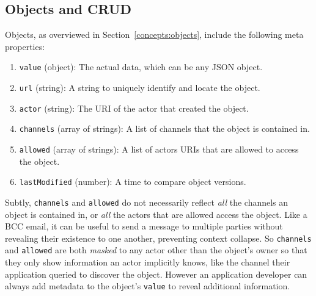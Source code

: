 
\subsection{Objects and CRUD}

Objects, as overviewed in Section~\ref{concepts:objects}, include
the following meta properties:
\begin{enumerate}
\item
\texttt{value} (object): The actual data, which can be any JSON object.
\item
\texttt{url} (string): A string to uniquely identify and locate the object.
\item
\texttt{actor} (string): The URI of the actor that created the object.
\item
\texttt{channels} (array of strings): A list of channels that the object is contained in.
\item
\texttt{allowed} (array of strings): A list of actors URIs that are allowed to access the object.
\item
\texttt{lastModified} (number): A time to compare object versions.
\end{enumerate}

Subtly, \texttt{channels} and \texttt{allowed} do not necessarily
reflect \emph{all} the channels an object is contained in, or
\emph{all} the actors that are allowed access the object.
Like a BCC email, it can be useful to send a message to multiple parties
without revealing their existence to one another, preventing
context collapse.
So \texttt{channels} and \texttt{allowed} are both \emph{masked} to any
actor other than the object's owner so that they only show information an actor implicitly knows,
like the channel their application queried to discover the object.
However an application developer can always
add metadata to the object's \texttt{value}
to reveal additional information.

